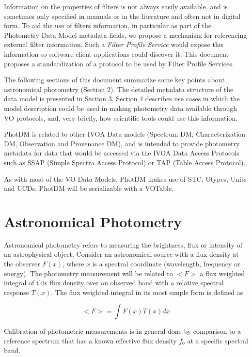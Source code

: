 \documentclass[11pt,a4paper]{ivoa}
\begin{document}
Information on the properties of filters is not always easily available, and is sometimes only specified in manuals or in the literature and often not in digital form. To aid the use of filters information, in particular as part of the Photometry Data Model metadata fields, we propose a mechanism for referencing external filter information. Such a \textit{Filter Profile Service} would expose this information so software client applications could discover it. This document proposes a standardization of a protocol to be used by Filter Profile Services.
\par

The following sections of this document summarize some key points about astronomical photometry (Section 2). The detailed metadata structure of the data model is presented in Section 3. Section 4 describes use cases in which the model description could be used in making photometry data available through VO protocols, and, very briefly, how scientific tools could use this information.
\par

PhotDM is related to other IVOA Data models (Spectrum DM, Characterization DM, Observation and Provenance DM),  and is intended to provide photometry metadata for data that would be accessed via the IVOA Data Access Protocols such as SSAP (Simple Spectra Access Protocol) or TAP (Table Access Protocol).
\par

As with most of the VO Data Models, PhotDM makes use of STC, Utypes, Units and UCDs. PhotDM will be serializable with a VOTable.
\par

\section{Astronomical Photometry}
Astronomical photometry refers to measuring the brightness, flux or intensity of an astrophysical object. Consider an astronomical source with a flux density at the observer $F(x)$, where $x$ is a spectral coordinate (wavelength, frequency or energy).  The photometry measurement will be related to $<F>$ a flux weighted integral of this flux density over an observed band with a relative spectral response $T(x)$. The flux weighted integral in its most simple form is defined as
\par

\[ <F> = \int F(x)T(x)dx \]

Calibration of photometric measurements is in general done by comparison to a reference spectrum that has a known effective flux density $f_0$ at a specific spectral band.
\par
\end{document}
